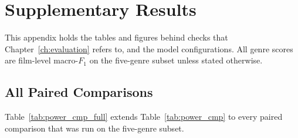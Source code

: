 \chapter{Supplementary Results}
\label{app:supplementary}


This appendix holds the tables and figures behind checks that Chapter~\ref{ch:evaluation}
refers to, and the model configurations. All genre scores are film-level macro-$F_1$ on the five-genre subset unless stated otherwise.

\section{All Paired Comparisons}
\label{sec:app_comparisons}

Table~\ref{tab:power_cmp_full} extends Table~\ref{tab:power_cmp} to every paired
comparison that was run on the five-genre subset.

